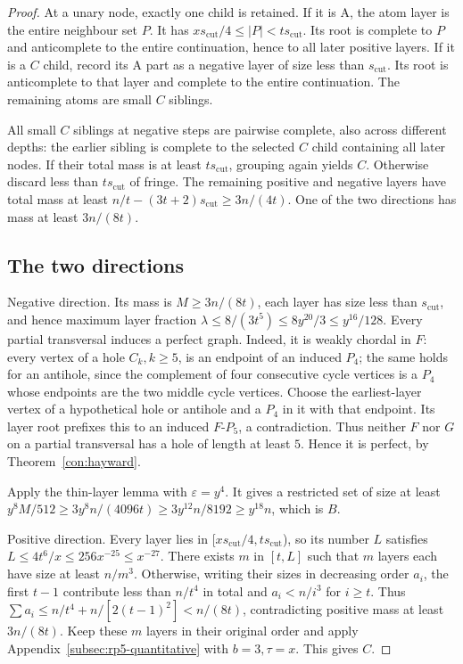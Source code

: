 \documentclass[11pt,a4paper]{article}
\theoremstyle{definition}
\theoremstyle{remark}
\numberwithin{equation}{section}
\begin{document}
\begin{proof}
At a unary node, exactly one child is retained. If it is A, the atom layer is the entire neighbour set \(P\). It has \(xs_{\mathrm{cut}}/4\le\allowbreak |P|<ts_{\mathrm{cut}}\). Its root is complete to \(P\) and anticomplete to the entire continuation, hence to all later positive layers. If it is a \(C\) child, record its A part as a negative layer of size less than \(s_{\mathrm{cut}}\). Its root is anticomplete to that layer and complete to the entire continuation. The remaining atoms are small \(C\) siblings.

All small \(C\) siblings at negative steps are pairwise complete, also across different depths: the earlier sibling is complete to the selected \(C\) child containing all later nodes. If their total mass is at least \(ts_{\mathrm{cut}}\), grouping again yields \(C\). Otherwise discard less than \(ts_{\mathrm{cut}}\) of fringe. The remaining positive and negative layers have total mass at least \(n/t-(3t+2)s_{\mathrm{cut}}\ge\allowbreak 3n/(4t)\). One of the two directions has mass at least \(3n/(8t)\).
\subsection{The two directions}\label{subsec:rp5-directions}
Negative direction. Its mass is \(M\ge\allowbreak 3n/(8t)\), each layer has size less than \(s_{\mathrm{cut}}\), and hence maximum layer fraction \(\lambda\le\allowbreak 8/(3t^{5})\le\allowbreak 8y^{20}/3\le\allowbreak y^{16}/128\). Every partial transversal induces a perfect graph. Indeed, it is weakly chordal in \(F\): every vertex of a hole \(C_{k},\allowbreak  k\ge\allowbreak 5\), is an endpoint of an induced \(P_{4}\); the same holds for an antihole, since the complement of four consecutive cycle vertices is a \(P_{4}\) whose endpoints are the two middle cycle vertices. Choose the earliest-layer vertex of a hypothetical hole or antihole and a \(P_{4}\) in it with that endpoint. Its layer root prefixes this to an induced \(F\text{-}P_{5}\), a contradiction. Thus neither \(F\) nor \(G\) on a partial transversal has a hole of length at least \(5\). Hence it is perfect, by Theorem~\ref{con:hayward}.

Apply the thin-layer lemma with \(\varepsilon=y^{4}\). It gives a restricted set of size at least \(y^{8} M/512\ge\allowbreak 3y^{8} n/(4096t)\ge\allowbreak 3y^{12} n/8192\ge\allowbreak y^{18} n\), which is \(B\).

Positive direction. Every layer lies in [\(xs_{\mathrm{cut}}/4,\allowbreak ts_{\mathrm{cut}}\)), so its number \(L\) satisfies \(L\le\allowbreak 4t^{6}/x\le\allowbreak 256x^{-25}\le\allowbreak x^{-27}\). There exists \(m\) in \([t,\allowbreak L]\) such that \(m\) layers each have size at least \(n/m^{3}\). Otherwise, writing their sizes in decreasing order \(a_{i}\), the first \(t-1\) contribute less than \(n/t^{4}\) in total and \(a_{i}<n/i^{3}\) for \(i\ge\allowbreak t\). Thus \(\sum  a_{i}\le n/t^{4}+n/[2(t-1)^{2}]<n/(8t)\), contradicting positive mass at least \(3n/(8t)\). Keep these \(m\) layers in their original order and apply Appendix~\ref{subsec:rp5-quantitative} with \(b=3,\allowbreak \tau=x\). This gives \(C\).

\end{proof}
\end{document}
